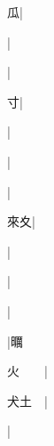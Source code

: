 \begin{multicols}{2}
{{\cjk{}{\cnsym{}　}{\cnsym{}　}瓜}|{}\par
{}|{}\par
{\cjk{}{\cnsym{}　}{\cnsym{}　}{\cnsym{}　}}|{}\par
{寸}|{}\par
{\cjk{}{\cnsym{}　}{\cnsym{}　}{\cnsym{}　}}|{}\par
{}|{}\par
{\cjk{}{\cnsym{}　}{\cnsym{}　}{\cnsym{}　}}|{}\par
{\cjk{}{\cnsym{}　}來夊}|{}\par
{\cjk{}{\cnsym{}　}{\cnsym{}　}{\cnsym{}　}}|{}\par
{\cjk{}{\cnsym{}　}{\cnsym{}　}{\cnsym{}　}}|{}\par
{\cjk{}{\cnsym{}　}{\cnsym{}　}{\cnsym{}　}}|{}\par
{\cjk{}{\cnsym{}　}{\cnsym{}　}{\cnsym{}　}}|{\cjk{}曞}\par
{\cjk{}火{\cnsym{}　}{\cnsym{}　}}|{}\par
{\cjk{}犬土{\cnsym{}　}}|{}\par
{\cjk{}{\cnsym{}　}{\cnsym{}　}{\cnsym{}　}}|{}\par
}
\end{multicols}
